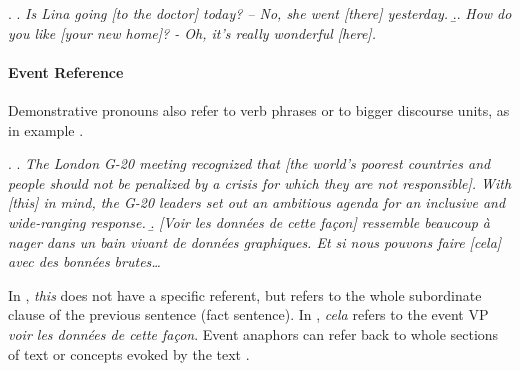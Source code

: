\documentclass[a4paper]{article}
\begin{document}
\ex.
\a. {\sl Is Lina going [to the doctor] today? -- No, she went [there] yesterday.}
\b.. {\sl How do you like [your new home]? - Oh, it's really wonderful [here].}

\paragraph*{Event Reference}

Demonstrative pronouns also refer to verb phrases or to bigger discourse units, as in example \Next. 

\ex.
\a. {\sl The London G-20 meeting recognized that [the world's poorest countries and people should not be penalized by a crisis for which they are not responsible]. With [this] in mind, the G-20 leaders set out an ambitious agenda for an inclusive and wide-ranging response.}
\b. \textsl{[Voir les données de cette façon] ressemble beaucoup à nager dans un
bain vivant de données graphiques. Et si nous pouvons faire [cela] avec des
bonnées brutes\ldots}

In \Last[a], {\sl this} does not have a specific referent, but refers to the
whole subordinate clause of the previous sentence (fact sentence). In \Last[b],
\textsl{cela} refers to the event VP \textsl{voir les données de cette façon}.
Event anaphors can refer back to whole sections of text or concepts evoked by
the text \cite[p. 8]{GuillouEtAlGuide}. 


% 
\end{document}
